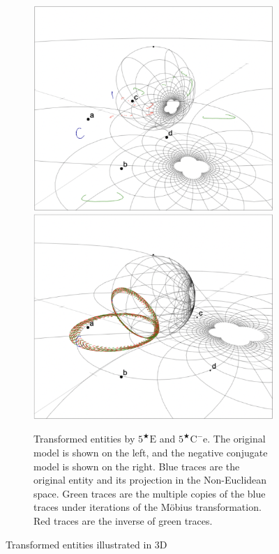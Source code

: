 \documentclass[11pt]{article}
\begin{document}
\begin{figure}[h!]
    \begin{subfigure}{.49\textwidth}
        \includegraphics[scale=0.15]{figures/fivestare.png}
        \includegraphics[scale=0.15]{figures/fivestarce.png}
        \caption{
            Transformed entities by $5^{\bigstar}\mathrm{E}$ and $5^{\bigstar}\mathrm{C^{-}e}$.
            The original model is shown on the left, and the negative conjugate model is shown on the right.
            Blue traces are the original entity and its projection in the Non-Euclidean space.
            Green traces are the multiple copies of the blue traces under iterations of the Möbius transformation.
            Red traces are the inverse of green traces.}
    \end{subfigure}
    \caption{Transformed entities illustrated in 3D
}
    
\end{figure}\label{entities}
\end{document}

